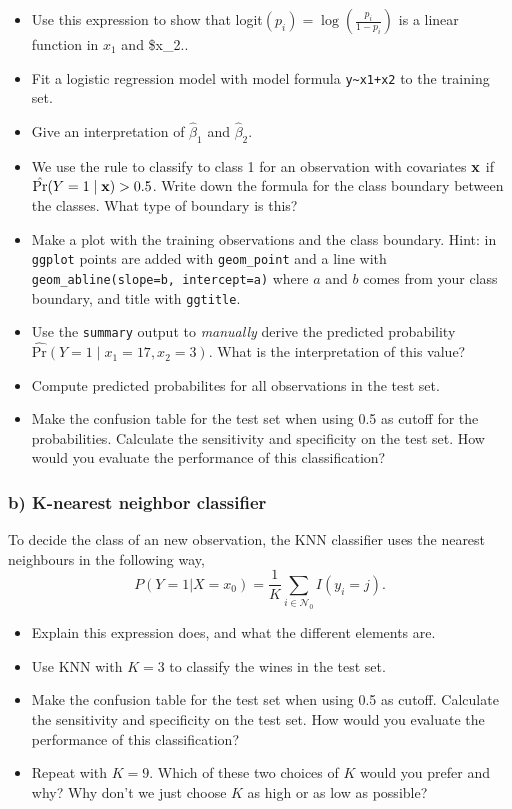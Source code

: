 \documentclass[]{article}
\providecommand{\tightlist}{%
  \setlength{\itemsep}{0pt}\setlength{\parskip}{0pt}}
\begin{document}
\begin{itemize}
\tightlist
\item
  Use this expression to show that
  logit\((p_i)=\log(\frac{p_i}{1-p_i})\) is a linear function in \(x_1\)
  and \$x\_2..
\item
  Fit a logistic regression model with model formula
  \texttt{y\textasciitilde{}x1+x2} to the training set.
\item
  Give an interpretation of \(\hat{\beta}_1\) and \(\hat{\beta}_2\).
\item
  We use the rule to classify to class 1 for an observation with
  covariates \({\bf x}\) if \(\hat{\text{Pr}}(Y=1\mid {\bf x})>0.5\).
  Write down the formula for the class boundary between the classes.
  What type of boundary is this?
\item
  Make a plot with the training observations and the class boundary.
  Hint: in \texttt{ggplot} points are added with \texttt{geom\_point}
  and a line with \texttt{geom\_abline(slope=b,\ intercept=a)} where
  \(a\) and \(b\) comes from your class boundary, and title with
  \texttt{ggtitle}.
\item
  Use the \texttt{summary} output to \emph{manually} derive the
  predicted probability \(\hat{\text{Pr}}(Y=1\mid x_1=17, x_2=3)\). What
  is the interpretation of this value?
\item
  Compute predicted probabilites for all observations in the test set.
\item
  Make the confusion table for the test set when using 0.5 as cutoff for
  the probabilities. Calculate the sensitivity and specificity on the
  test set. How would you evaluate the performance of this
  classification?
\end{itemize}

\subsubsection{b) K-nearest neighbor
classifier}\label{b-k-nearest-neighbor-classifier}

To decide the class of an new observation, the KNN classifier uses the
nearest neighbours in the following way, \[
P(Y=1|X=x_0) = \frac{1}{K}\sum_{i\in \mathcal{N_0}}I(y_i=j).
\]

\begin{itemize}
\tightlist
\item
  Explain this expression does, and what the different elements are.
\item
  Use KNN with \(K=3\) to classify the wines in the test set.
\item
  Make the confusion table for the test set when using 0.5 as cutoff.
  Calculate the sensitivity and specificity on the test set. How would
  you evaluate the performance of this classification?
\item
  Repeat with \(K=9\). Which of these two choices of \(K\) would you
  prefer and why? Why don't we just choose \(K\) as high or as low as
  possible?
\end{itemize}
\end{document}
